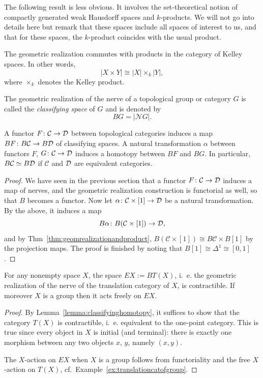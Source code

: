 \documentclass[a4paper,openany]{scrbook}
\renewcommand{\C}{\mathcal C}
\newcommand{\nerve}{\mathcal N}
\begin{document}
The following result is less obvious. It involves the set-theoretical notion of compactly generated weak Hausdorff spaces and $k$-products. We will not go into details here but remark that these spaces include all spaces of interest to us, and that for these spaces, the $k$-product coincides with the usual product. 
\begin{thm} \label{thm:geomrealizationandproduct}
The geometric realization commutes with products in the category of Kelley spaces. In other words,
\[
| X \times Y | \cong |X| \times_k |Y|,
\]
where $\times_k$ denotes the Kelley product.
\end{thm}

\begin{defn}
The geometric realization of the nerve of a topological group or category $G$ is called the \emph{classifying space} of $G$ and is denoted by
\[
BG = |\nerve G|.
\]
\end{defn}



\begin{lemma}\label{lemma:classifyinghomotopy}
A functor $F\colon \C \to \D$ between topological categories induces a map $BF\colon B\C \to B\D$ of classifying spaces. A natural transformation $\alpha$ between functors $F$, $G\colon \C \to \D$ induces a homotopy between $BF$ and $BG$. In particular, $B\C \simeq B\D$ if $\C$ and $\mathcal D$ are equivalent categories.
\end{lemma}
\begin{proof}
We have seen in the previous section that a functor $F\colon \C \to \D$ induces a map of nerves, and the geometric realization construction is functorial as well, so that $B$ becomes a functor. Now let $\alpha\colon \C \times [1] \to \D$ be a natural transformation. By the above, it induces a map
\[
B\alpha\colon B(\C \times [1]) \to \D,
\]
and by Thm~\ref{thm:geomrealizationandproduct}, $B(\C \times [1]) \cong B\C \times B[1]$ by the projection maps. The proof is finished by noting that $B[1] \cong \Delta^1 \cong [0,1]$.
\end{proof}


\begin{corollary}\label{cor:EG}
For any nonempty space $X$, the space $EX := BT(X)$, i.~e. the geometric realization of the nerve of the translation category of $X$, is contractible. If moreover $X$ is a group then it acts freely on $EX$.
\end{corollary}
\begin{proof}
By Lemma~\ref{lemma:classifyinghomotopy}, it suffices to show that the category $T(X)$ is contractible, i.~e. equivalent to the one-point category. This is true since every object in $X$ is initial (and terminal): there is exactly one morphism between any two objects $x$, $y$, namely $(x,y)$.

The $X$-action on $EX$ when $X$ is a group follows from functoriality and the free $X$-action on $T(X)$, cf.~Example~\ref{ex:translationcatofgroup}.
\end{proof}
\end{document}
